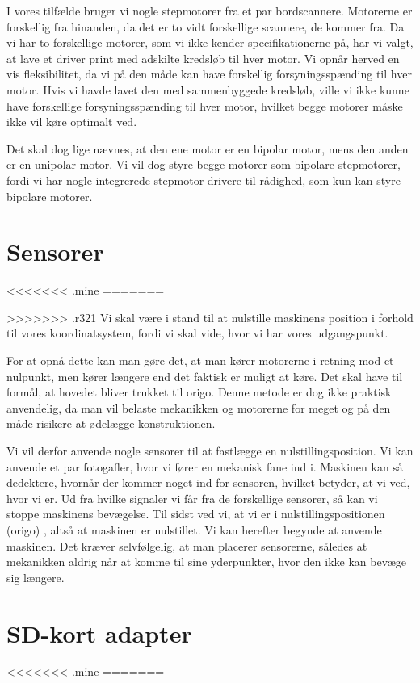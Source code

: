 I vores tilfælde bruger vi nogle stepmotorer fra et par
bordscannere. Motorerne er forskellig fra hinanden, da det er to vidt
forskellige scannere, de kommer fra. Da vi har to forskellige motorer,
som vi ikke kender specifikationerne på, har vi valgt, at lave et
driver print med adskilte kredsløb til hver motor. Vi opnår herved en
vis fleksibilitet, da vi på den måde kan have forskellig
forsyningsspænding til hver motor. Hvis vi havde lavet den med
sammenbyggede kredsløb, ville vi ikke kunne have forskellige
forsyningsspænding til hver motor, hvilket begge motorer måske ikke
vil køre optimalt ved.

Det skal dog lige nævnes, at den ene motor er en bipolar motor, mens
den anden er en unipolar motor. Vi vil dog styre begge motorer som
bipolare stepmotorer, fordi vi har nogle integrerede stepmotor
drivere til rådighed, som kun kan styre bipolare motorer.


\section{Sensorer}
<<<<<<< .mine
\label{sc:sensorer}
=======

>>>>>>> .r321
Vi skal være i stand til at nulstille maskinens position i forhold til
vores koordinatsystem, fordi vi skal vide, hvor vi har vores
udgangspunkt.

For at opnå dette kan man gøre det, at man kører motorerne i retning
mod et nulpunkt, men kører længere end det faktisk er muligt at
køre. Det skal have til formål, at hovedet bliver trukket til
origo. Denne metode er dog ikke praktisk anvendelig, da man vil belaste
mekanikken og motorerne for meget og på den måde risikere at ødelægge
konstruktionen.

Vi vil derfor anvende nogle sensorer til at fastlægge en
nulstillingsposition. Vi kan anvende et par fotogafler, hvor vi fører
en mekanisk fane ind i. Maskinen kan så dedektere, hvornår der kommer
noget ind for sensoren, hvilket betyder, at vi ved, hvor vi er. Ud fra
hvilke signaler vi får fra de forskellige sensorer, så kan vi stoppe
maskinens bevægelse. Til sidst ved vi, at vi er i
nulstillingspositionen (origo) , altså at maskinen er nulstillet. Vi
kan herefter begynde at anvende maskinen. Det kræver selvfølgelig, at
man placerer sensorerne, således at mekanikken aldrig når at komme til
sine yderpunkter, hvor den ikke kan bevæge sig længere.


\section{SD-kort adapter}
<<<<<<< .mine
\label{sc:sda}
=======

